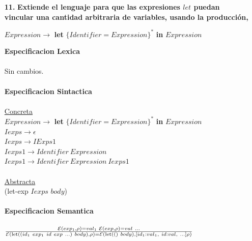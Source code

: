 \documentclass{article}
\begin{document}
\begin{itemize}
    \item[\textbf{11.}] \textbf{{\Large Extiende el lenguaje para que las expresiones $let$ puedan vincular una cantidad arbitraria de variables, usando la producción,}}
    \begin{center}
        $Expression\rightarrow$ \textbf{let} $\{ Identifier = Expression \}^*$ \textbf{in} $Expression$
    \end{center}
    \textbf{Especificacion Lexica}\\
    \\
    \hspace*{10mm} Sin cambios.\\
    \\
    \textbf{Especificacion Sintactica}\\
    \\
    \hspace*{10mm} \underline{Concreta}\\
    \hspace*{10mm} $Expression\rightarrow$ \textbf{let} $\{ Identifier = Expression \}^*$ \textbf{in} $Expression$\\
    \hspace*{10mm} $Iexps\rightarrow\epsilon$\\
    \hspace*{10mm} $Iexps\rightarrow IExps1$\\
    \hspace*{10mm} $Iexps1\rightarrow Identifier\ Expression$\\
    \hspace*{10mm} $Iexps1\rightarrow Identifier\ Expression\ Iexps1$\\
    \\
    \hspace*{10mm} \underline{Abstracta}\\
    \hspace*{10mm} (let-exp $Iexps$ $body$)\\
    \\
    \textbf{Especificacion Semantica}\\
    \\
    \hspace*{10mm}
        $\frac
        {\mathcal{E}(exp_1,\rho)=val_1\hspace{1mm}\mathcal{E}(exp,\rho)=val\ ...}
        {\mathcal{E}(\text{let}((id_1\ exp_1\ id\ exp\ ...)\ body),\rho)=\mathcal{E}(\text{let}(()\ body), [id_1 : val_1,\ id : val,\ ...]\rho)}$

\end{itemize}
\end{document}
